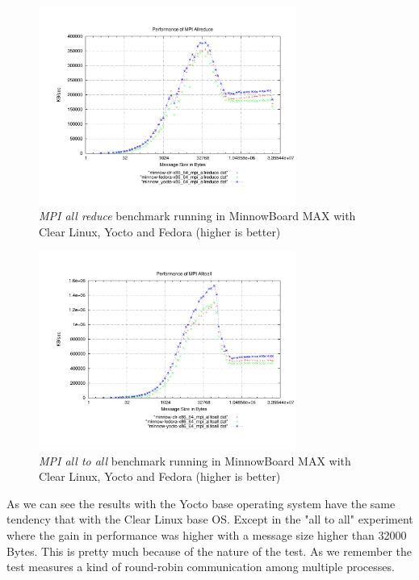 \begin{figure}[H]
\centering
\includegraphics[width=0.75\textwidth]{images/mpbench_yocto_experiments/mpi_allreduce.pdf}
\caption{\textit{MPI all reduce} benchmark running in  MinnowBoard MAX with Clear Linux,
Yocto and Fedora (higher is better)}
\label{mpi_allreduce_yocto}
\end{figure}

\begin{figure}[H]
\centering
\includegraphics[width=0.75\textwidth]{images/mpbench_yocto_experiments/mpi_alltoall.pdf}
\caption{\textit{MPI all to all} benchmark running in  MinnowBoard MAX with Clear Linux, Yocto
and Fedora (higher is better)}
\label{mpi_all_to_all_yocto}
\end{figure}

As we can see the results with the Yocto base operating system have the same
tendency that with the Clear Linux base OS. Except in the "all to all"
experiment where the gain in performance was higher with a message size higher
than 32000 Bytes. This is pretty much because of the nature of the test. As we
remember the test measures a kind of round-robin communication among multiple
processes.

